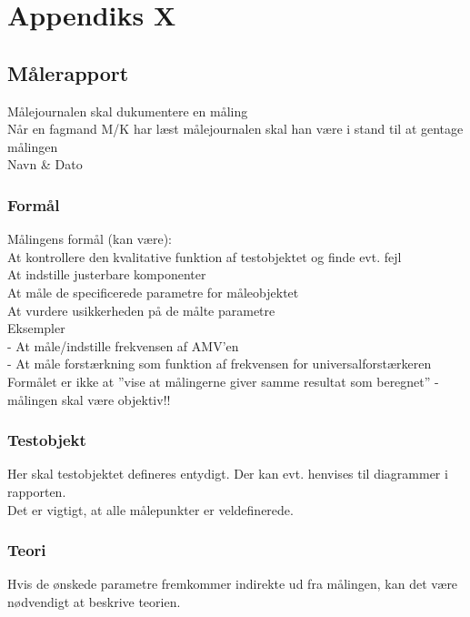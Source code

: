 %
%
\chapter{Appendiks X}
\label{maalejournal}
\section*{Målerapport}
Målejournalen skal dukumentere en måling\\
Når en fagmand M/K har læst målejournalen skal han være i stand til at gentage målingen\\
Navn \& Dato

\subsection*{Formål}
\label{maalejournal_formaal}
Målingens formål (kan være):\\
At kontrollere den kvalitative funktion af testobjektet og finde evt. fejl\\
At indstille justerbare komponenter \\
At måle de specificerede parametre for måleobjektet \\
At vurdere usikkerheden på de målte parametre\\
Eksempler \\
- At måle/indstille frekvensen af AMV’en\\
- At måle forstærkning som funktion af frekvensen for universalforstærkeren\\
Formålet er ikke at ”vise at målingerne giver samme resultat som beregnet” - målingen skal være objektiv!!\\

\subsection*{Testobjekt}
\label{maalejournal_testobjekt}
Her skal testobjektet defineres entydigt. Der kan evt. henvises til diagrammer i rapporten.\\
Det er vigtigt, at alle målepunkter er veldefinerede.\\

\subsection*{Teori}
\label{maalejournal_teori}
Hvis de ønskede parametre fremkommer indirekte ud fra målingen, kan det være nødvendigt at beskrive teorien.\\

